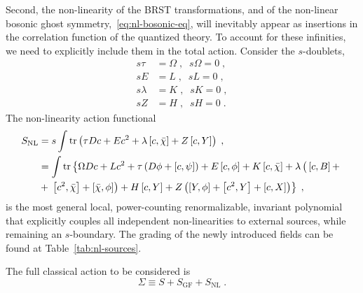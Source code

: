 \documentclass[../main.tex]{subfiles}
\begin{document}
Second, the non-linearity of the BRST transformations, and of the non-linear bosonic ghost symmetry,~\eqref{eq:nl-bosonic-eq}, will inevitably appear as insertions in the correlation function of the quantized theory. To account for these infinities, we need to explicitly include them in the total action. Consider the $ s $-doublets,
\begin{subequations}%
  \label{eq:nl-s-doublets}
  \begin{align}
    s\tau    & = \Omega \;, \;\; s\Omega   = 0 \;, \\
    sE       & = L \;, \;\; sL        = 0 \;,      \\
    s\lambda & = K \;, \;\; sK        = 0 \;,      \\
    sZ       & = H \;, \;\; sH        = 0 \;.
  \end{align}
\end{subequations}
The non-linearity action functional
\begin{subequations}%
  \label{eq:nl-action}
  \begin{align}
    S_{\text{NL}} & = s \int \operatorname{tr} \left( \tau Dc + E c^2 + \lambda \left[ c,\bar\chi \right] + Z \left[ c,Y \right] \right) \;, \label{eq:nl-action-1}                                                                                           \\
                  & = \int \operatorname{tr} \left\{ \Omega Dc + Lc^2 + \tau \left( D\phi + \left[ c,\psi \right] \right) + E \left[ c,\phi \right] + K \left[ c,\bar\chi \right] + \lambda \left(\vphantom{^2}\left[ c,B \right] + \right. \right. \nonumber \\
                  & + \left. \left. \left[ c^2,\bar\chi \right] + \left[ \bar\chi,\phi \right] \right) + H \left[ c, Y \right] + Z \left( \left[ Y, \phi \right] + \left[ c^2, Y \right] + \left[ c, X \right] \right) \right\} \;,
  \end{align}
\end{subequations}
is the most general local, power-counting renormalizable, invariant polynomial that explicitly couples all independent non-linearities to external sources, while remaining an $ s $-boundary. The grading of the newly introduced fields can be found at Table~\ref{tab:nl-sources}.

The full classical action to be considered is
\begin{equation}
  \label{eq:total-action}
  \Sigma \equiv S + S_{\text{GF}} + S_{ \text{NL} }\; .
\end{equation}
\end{document}
